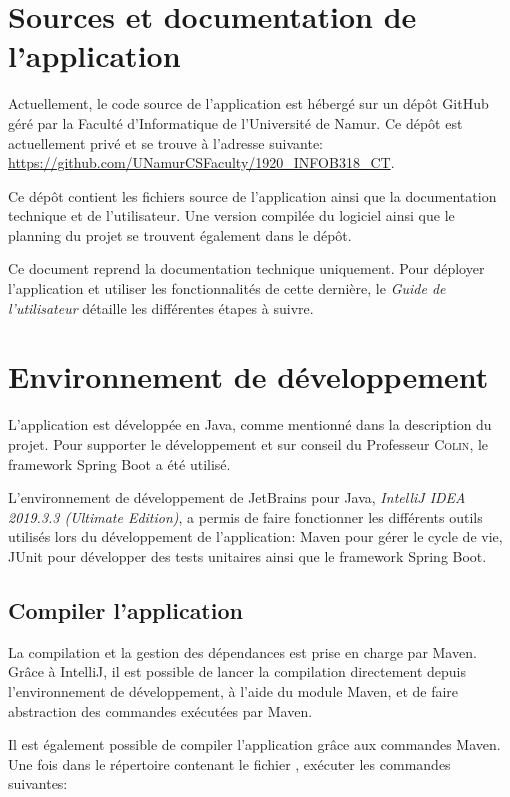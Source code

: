 \documentclass{article}
\begin{document}
\section{Sources et documentation de l'application}

Actuellement, le code source de l'application est hébergé sur un dépôt GitHub géré par la Faculté d'Informatique de l'Université de Namur.  Ce dépôt est actuellement privé et se trouve à l'adresse suivante: \url{https://github.com/UNamurCSFaculty/1920_INFOB318_CT}.

Ce dépôt contient les fichiers source de l'application ainsi que la documentation technique et de l'utilisateur.  Une version compilée du logiciel ainsi que le planning du projet se trouvent également dans le dépôt.

Ce document reprend la documentation technique uniquement.  Pour déployer l'application et utiliser les fonctionnalités de cette dernière, le \emph{Guide de l'utilisateur} détaille les différentes étapes à suivre.


\section{Environnement de développement}

L'application est développée en Java, comme mentionné dans la description du projet.  Pour supporter le développement et sur conseil du Professeur \textsc{Colin}, le framework Spring Boot a été utilisé.  

L'environnement de développement de JetBrains pour Java, \emph{IntelliJ IDEA 2019.3.3 (Ultimate Edition)}, a permis de faire fonctionner les différents outils utilisés lors du développement de l'application: Maven pour gérer le cycle de vie, JUnit pour développer des tests unitaires ainsi que le framework Spring Boot.


\subsection{Compiler l'application}

La compilation et la gestion des dépendances est prise en charge par Maven.  Grâce à IntelliJ, il est possible de lancer la compilation directement depuis l'environnement de développement, à l'aide du module Maven, et de faire abstraction des commandes exécutées par Maven.

Il est également possible de compiler l'application grâce aux commandes Maven.  Une fois dans le répertoire contenant le fichier , exécuter les commandes suivantes:
\end{document}
